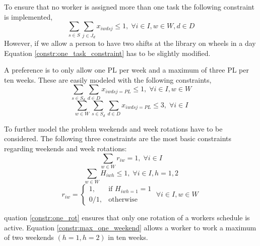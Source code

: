 To ensure that no worker is assigned more than one task the following constraint is implemented,
\begin{equation} \label{constr:one_task_constraint}
\sum_{s\in S}\sum_{j\in J_d} x_{iwdsj} \leq 1, \; \forall i\in I, w \in W, d\in D
\end{equation}
However, if we allow a person to have two shifts at the library on wheels in a day Equation \ref{constr:one_task_constraint} has to be slightly modified.

A preference is to only allow one PL per week and a maximum of three PL per ten weeks. These are easily modeled with the following constraints,
\begin{equation} \label{constr:one_PL}
\sum_{s \in S_d}\sum_{d \in D} x_{iwdsj=PL} \leq 1, \; \forall i\in I, w \in W
\end{equation}
\begin{equation} \label{constr:three_PL}
\sum_{w \in W}\sum_{s \in S_d}\sum_{d \in D} x_{iwdsj=PL} \leq 3, \; \forall i\in I
\end{equation}

To further model the problem weekends and week rotations have to be considered. The following three constraints are the most basic constraints regarding weekends and week rotations:
\begin{equation} \label{constr:one_rot}
\sum_{w \in W} r_{iw} = 1, \; \forall i\in I
\end{equation}
\begin{equation} \label{constr:max_one_weekend}
\sum_{w \in W} H_{iwh} \leq 1, \; \forall i\in I, h = 1,2
\end{equation}
\begin{equation} \label{constr:rot_weekend}
r_{iw} =
	\begin{cases}
 		1, & \text{if $H_{iwh=1} = 1$} \\
 		0/1, & \text{otherwise}
	\end{cases}
	\; \forall i\in I, w \in W \;
\end{equation}

quation \ref{constr:one_rot} ensures that only one rotation of a workers schedule is active. Equation \ref{constr:max_one_weekend} allows a worker to work a maximum of two weekends $(h = 1, h = 2)$ in ten weeks.
